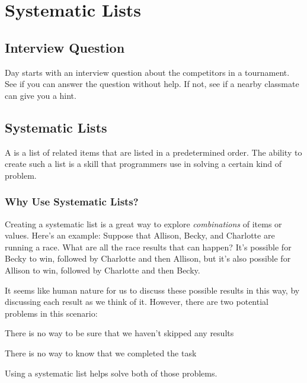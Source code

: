 
\setcounter{chapter}{3}
\chapter{Systematic Lists}


\minitoc

\section{Interview Question}

Day \thechapter{} starts with an interview question about the competitors in a tournament.  See if you can answer the question without help.  If not, see if a nearby classmate can give you a hint.

\section{Systematic Lists}

A  is a list of related items that are listed in a predetermined order.  The ability to create such a list is a skill that programmers use in solving a certain kind of problem.

\subsection{Why Use Systematic Lists?}

Creating a systematic list is a great way to explore \textit{combinations} of items or values.  Here's an example:  Suppose that Allison, Becky, and Charlotte are running a race.  What are all the race results that can happen?  It's possible for Becky to win, followed by Charlotte and then Allison, but it's also possible for Allison to win, followed by Charlotte and then Becky.

It seems like human nature for us to discuss these possible results in this way, by discussing each result as we think of it.  However, there are two potential problems in this scenario:
\bi
    \item There is no way to be sure that we haven't skipped any results
    \item There is no way to know that we completed the task
\ei

Using a systematic list helps solve both of those problems.

